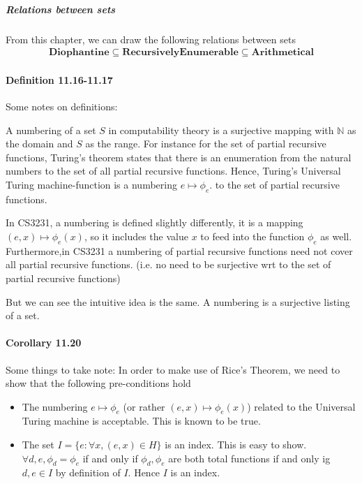 \documentclass{article}
\begin{document}
\subparagraph{Relations between sets} From this chapter, we can draw the following relations between sets
\begin{align*}
	\mathbf{Diophantine}\subseteq \mathbf{Recursively Enumerable}\subseteq \mathbf{Arithmetical}
\end{align*}

\paragraph{Definition 11.16-11.17} Some notes on definitions:

A numbering of a set $S$ in computability theory is a surjective mapping with $\mathbb{N}$ as the domain and $S$ as the range. For instance for the set of partial recursive functions, Turing's theorem states that there is an enumeration from the natural numbers to the set of all partial recursive functions. Hence, Turing's Universal Turing machine-function is a numbering $e\mapsto \phi_e$. to the set of partial recursive functions.

In CS3231, a numbering is defined slightly differently, it is a mapping $(e,x)\mapsto \phi_e(x)$, so it includes the value $x$ to feed into the function $\phi_e$ as well.\\
Furthermore,in CS3231 a numbering of partial recursive functions need not cover all partial recursive functions. (i.e. no need to be surjective wrt to the set of partial recursive functions)

But we can see the intuitive idea is the same. A numbering is a surjective listing of a set.

\paragraph{Corollary 11.20} Some things to take note: In order to make use of Rice's Theorem, we need to show that the following pre-conditions hold
\begin{itemize}
	\item The numbering $e\mapsto \phi_e$ (or rather $(e,x)\mapsto \phi_e(x)$) related to the Universal Turing machine is acceptable. This is known to be true.
	\item The set $I=\{e:\forall x, (e,x)\in H\}$ is an index. This is easy to show. $\forall d,e, \phi_d=\phi_e$ if and only if $\phi_d,\phi_e$ are both total functions if and only ig $d,e\in I$ by definition of $I$. Hence $I$ is an index.
\end{itemize}
\end{document}
